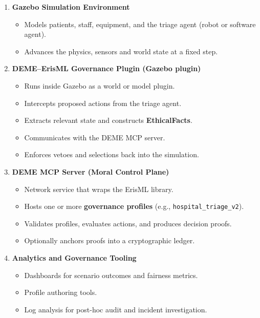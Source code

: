 \documentclass[11pt]{article}
\begin{document}
\begin{enumerate}
  \item \textbf{Gazebo Simulation Environment}
    \begin{itemize}
      \item Models patients, staff, equipment, and the triage agent (robot or software agent).
      \item Advances the physics, sensors and world state at a fixed step.
    \end{itemize}

  \item \textbf{DEME--ErisML Governance Plugin (Gazebo plugin)}
    \begin{itemize}
      \item Runs inside Gazebo as a world or model plugin.
      \item Intercepts proposed actions from the triage agent.
      \item Extracts relevant state and constructs \textbf{EthicalFacts}.
      \item Communicates with the DEME MCP server.
      \item Enforces vetoes and selections back into the simulation.
    \end{itemize}

  \item \textbf{DEME MCP Server (Moral Control Plane)}
    \begin{itemize}
      \item Network service that wraps the ErisML library.
      \item Hosts one or more \textbf{governance profiles} (e.g., \texttt{hospital\_triage\_v2}).
      \item Validates profiles, evaluates actions, and produces decision proofs.
      \item Optionally anchors proofs into a cryptographic ledger.
    \end{itemize}

  \item \textbf{Analytics and Governance Tooling}
    \begin{itemize}
      \item Dashboards for scenario outcomes and fairness metrics.
      \item Profile authoring tools.
      \item Log analysis for post-hoc audit and incident investigation.
    \end{itemize}
\end{enumerate}
\end{document}
